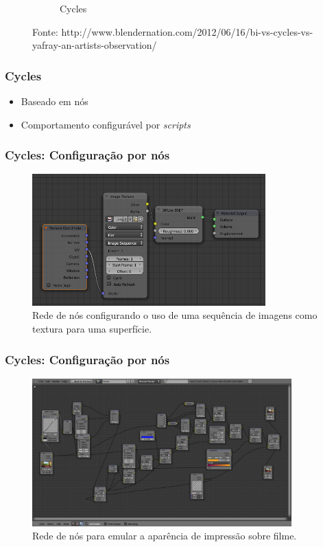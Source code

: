 \documentclass{beamer}
\begin{document}
\begin{frame}
\begin{figure}[!htb]
\begin{subfigure}{0.5\textwidth}
                \caption*{Cycles} 
        \end{subfigure}
        \caption*{\tiny Fonte: http://www.blendernation.com/2012/06/16/bi-vs-cycles-vs-yafray-an-artists-observation/ }
\end{figure}

\end{frame}


\begin{frame}

\frametitle{Cycles}
\begin{itemize}
\item Baseado em nós

\item Comportamento configurável por {\it scripts}
\end{itemize}


\end{frame}


\begin{frame}

\frametitle{Cycles: Configuração por nós}

\begin{figure}[!htb]
\center
\includegraphics[width=9cm]{Cycles_nodes}
\caption{Rede de nós configurando o uso de uma sequência de imagens como textura para uma superfície.}
\end{figure}

\end{frame}

\begin{frame}

\frametitle{Cycles: Configuração por nós}

\begin{figure}[!htb]
\center
\includegraphics[width=10cm]{film_lookNodeNetwork}
\caption{Rede de nós para emular a aparência de impressão sobre filme.}
\end{figure}

\end{frame}
\end{document}
